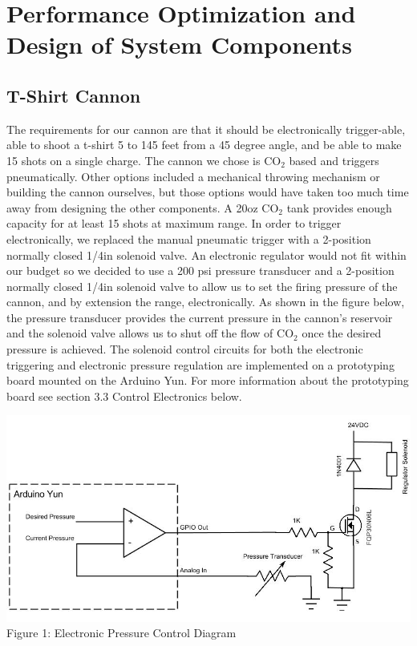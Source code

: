 \documentclass[letterpaper,12pt]{article}
\begin{document}
\section{Performance Optimization and Design of System Components}
\label{sec:optimization}

\subsection{T-Shirt Cannon}
The requirements for our cannon are that it should be electronically
trigger-able, able to shoot a t-shirt 5 to 145 feet from a 45 degree angle, and
be able to make 15 shots on a single charge. The cannon we chose is CO$_2$
based and triggers pneumatically. Other options included a mechanical throwing
mechanism or building the cannon ourselves, but those options would have taken
too much time away from designing the other components. A 20oz CO$_2$ tank
provides enough capacity for at least 15 shots at maximum range. In order to
trigger electronically, we replaced the manual pneumatic trigger with
a 2-position normally closed 1/4in solenoid valve. An electronic regulator
would not fit within our budget so we decided to use a 200 psi pressure
transducer and a 2-position normally closed 1/4in solenoid valve to allow us to
set the firing pressure of the cannon, and by extension the range,
electronically. As shown in the figure below, the pressure transducer provides
the current pressure in the cannon's reservoir and the solenoid valve allows us
to shut off the flow of CO$_2$ once the desired pressure is achieved. The
solenoid control circuits for both the electronic triggering and electronic
pressure regulation are implemented on a prototyping board mounted on the
Arduino Yun. For more information about the prototyping board see section 3.3
Control Electronics below.\\

\begin{center}
    \includegraphics[width=15cm]{./pics/cannon/PressureControl.jpg}\\
     Figure 1: Electronic Pressure Control Diagram
\end{center}
\end{document}
